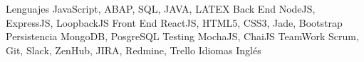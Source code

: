 


\begin{cvskills}

\cvskill
{Lenguajes} %
{JavaScript, ABAP, SQL, JAVA, LATEX } %
\cvskill
{Back End} %
{NodeJS, ExpressJS, LoopbackJS} %
\cvskill
{Front End} %
{ReactJS, HTML5, CSS3, Jade, Bootstrap} %
\cvskill
{Persistencia} %
{MongoDB, PosgreSQL} %
\cvskill
{Testing} %
{MochaJS, ChaiJS} %
\cvskill
{TeamWork} %
{Scrum, Git, Slack, ZenHub, JIRA, Redmine, Trello} %
\cvskill
{Idiomas} %
{Inglés} %
\end{cvskills}

